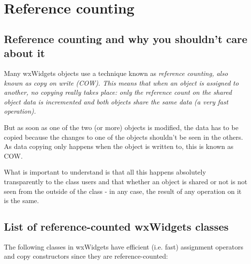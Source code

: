 \section{Reference counting}\label{trefcount}

\subsection{Reference counting and why you shouldn't care about it}\label{refcount}

Many wxWidgets objects use a technique known as \it{reference counting}, also known
as {\it copy on write} (COW).
This means that when an object is assigned to another, no copying really takes place:
only the reference count on the shared object data is incremented and both objects
share the same data (a very fast operation).

But as soon as one of the two (or more) objects is modified, the data has to be
copied because the changes to one of the objects shouldn't be seen in the
others. As data copying only happens when the object is written to, this is
known as COW.

What is important to understand is that all this happens absolutely
transparently to the class users and that whether an object is shared or not
is not seen from the outside of the class - in any case, the result of any
operation on it is the same.

\subsection{List of reference-counted wxWidgets classes}\label{refcountlist}

The following classes in wxWidgets have efficient (i.e. fast) assignment operators
and copy constructors since they are reference-counted:

\\
\\
\\
\\
\\
\\
\\
\\
\\
\\

